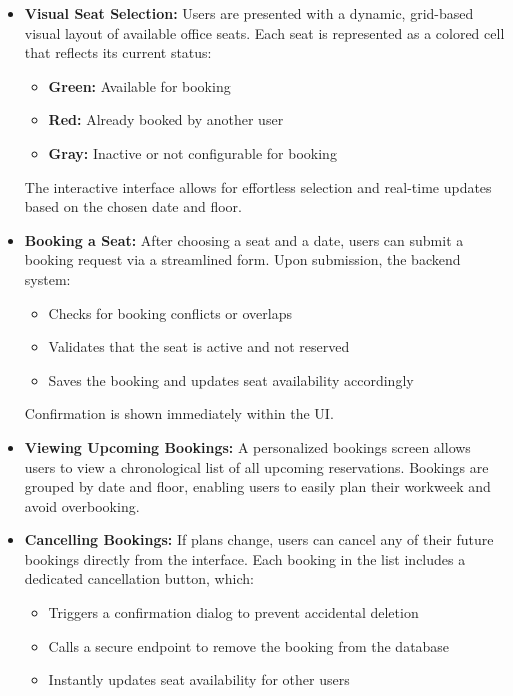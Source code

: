 \documentclass[12pt,a4paper]{report}
\begin{document}
\begin{itemize}
    \item \textbf{Visual Seat Selection:}  
    Users are presented with a dynamic, grid-based visual layout of available office seats. Each seat is represented as a colored cell that reflects its current status:
    \begin{itemize}
        \item \textbf{Green:} Available for booking
        \item \textbf{Red:} Already booked by another user
        \item \textbf{Gray:} Inactive or not configurable for booking
    \end{itemize}
    The interactive interface allows for effortless selection and real-time updates based on the chosen date and floor.

    \item \textbf{Booking a Seat:}  
    After choosing a seat and a date, users can submit a booking request via a streamlined form. Upon submission, the backend system:
    \begin{itemize}
        \item Checks for booking conflicts or overlaps
        \item Validates that the seat is active and not reserved
        \item Saves the booking and updates seat availability accordingly
    \end{itemize}
    Confirmation is shown immediately within the UI.

    \item \textbf{Viewing Upcoming Bookings:}  
    A personalized bookings screen allows users to view a chronological list of all upcoming reservations. Bookings are grouped by date and floor, enabling users to easily plan their workweek and avoid overbooking.

    \item \textbf{Cancelling Bookings:}  
    If plans change, users can cancel any of their future bookings directly from the interface. Each booking in the list includes a dedicated cancellation button, which:
    \begin{itemize}
        \item Triggers a confirmation dialog to prevent accidental deletion
        \item Calls a secure endpoint to remove the booking from the database
        \item Instantly updates seat availability for other users
    \end{itemize}
\end{itemize}
\end{document}
